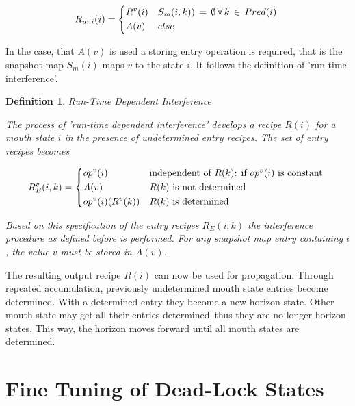 \documentclass[12pt,a4paper]{scrartcl}
\newtheorem{definition}{Definition}
\begin{document}
\begin{equation}
    R_{uni}(i) = \begin{dcases*}
                 R^v(i) & $S_m(i,k))\,=\,\emptyset\,\forall\,k\,\in\,Pred(i)$ \\
                 A(v)   & $else$
                 \end{dcases*}
\end{equation}

In the case, that $A(v)$ is used a storing entry operation is required, that is
the snapshot map $S_m(i)$ maps $v$ to the state $i$. It follows the definition of
'run-time interference'.

\begin{definition}
Run-Time Dependent Interference

The process of 'run-time dependent interference' develops a recipe $R(i)$
for a mouth state $i$ in the presence of undetermined entry recipes. The
set of entry recipes becomes

\begin{equation}
    R_E^v(i,k) = \begin{dcases*}
                 op^v(i)         & independent of $R(k)$: if $op^v(i)$ is constant \\
                 A(v)            & $R(k)$ is not determined  \\
                 op^v(i)(R^v(k)) & $R(k)$ is determined 
                 \end{dcases*}
\end{equation}

Based on this specification of the entry recipes $R_E(i,k)$ the interference
procedure as defined before is performed. For any snapshot map entry
containing $i$, the value $v$ must be stored in $A(v)$.
\end{definition}

The resulting output recipe $R(i)$ can now be used for propagation. Through
repeated accumulation, previously undetermined mouth state entries become
determined. With a determined entry they become a new horizon state. Other
mouth state may get all their entries determined--thus they are no longer
horizon states. This way, the horizon moves forward until all mouth states are
determined. 

%
\section{Fine Tuning of Dead-Lock States}
\end{document}
